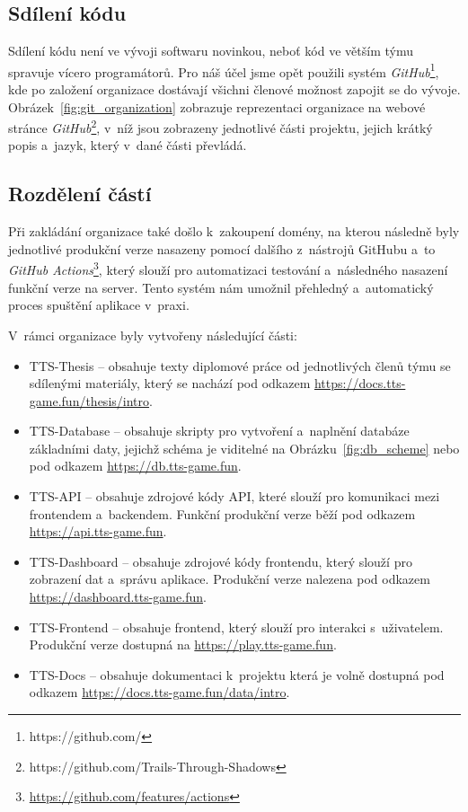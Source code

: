 \subsection{Sdílení kódu}
\label{subsec:implementation-collaboration-sharing}
Sdílení kódu není ve vývoji softwaru novinkou, neboť kód ve větším týmu spravuje vícero programátorů. Pro náš účel jsme opět použili systém \textit{GitHub}\footnote{https://github.com/}, kde po založení organizace dostávají všichni členové možnost zapojit se do vývoje. Obrázek~\ref{fig:git_organization} zobrazuje reprezentaci organizace na webové stránce \textit{GitHub}\footnote{https://github.com/Trails-Through-Shadows}, v~níž jsou zobrazeny jednotlivé části projektu, jejich krátký popis a~jazyk, který v~dané části převládá.

\subsection*{Rozdělení částí}
\label{subsec:implementation-collaboration-sharing-parts}
Při zakládání organizace také došlo k~zakoupení domény, na kterou následně byly jednotlivé produkční verze nasazeny pomocí dalšího z~nástrojů GitHubu a~to \textit{GitHub Actions}\footnote{\href{https://github.com/features/actions}{https://github.com/features/actions}}, který slouží pro automatizaci testování a~následného nasazení funkční verze na server. Tento systém nám umožnil přehledný a~automatický proces spuštění aplikace v~praxi.

\noindent
V~rámci organizace byly vytvořeny následující části:

\begin{itemize}
    \item TTS-Thesis    -- obsahuje texty diplomové práce od jednotlivých členů týmu se sdílenými materiály, který se nachází pod odkazem \url{https://docs.tts-game.fun/thesis/intro}.
    \item TTS-Database  -- obsahuje skripty pro vytvoření a~naplnění databáze základními daty, jejichž schéma je viditelné na Obrázku~\ref{fig:db_scheme} nebo pod odkazem \url{https://db.tts-game.fun}.
    \item TTS-API       -- obsahuje zdrojové kódy API, které slouží pro komunikaci mezi frontendem a~backendem. Funkční produkční verze běží pod odkazem \url{https://api.tts-game.fun}.
    \item TTS-Dashboard -- obsahuje zdrojové kódy frontendu, který slouží pro zobrazení dat a~správu aplikace. Produkční verze nalezena pod odkazem \url{https://dashboard.tts-game.fun}.
    \item TTS-Frontend  -- obsahuje frontend, který slouží pro interakci s~uživatelem. Produkční verze dostupná na \url{https://play.tts-game.fun}.
    \item TTS-Docs      -- obsahuje dokumentaci k~projektu která je volně dostupná pod odkazem \url{https://docs.tts-game.fun/data/intro}.
\end{itemize}

